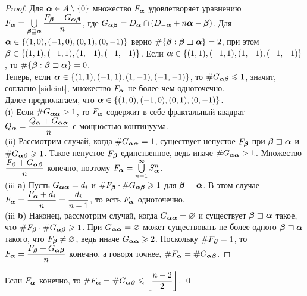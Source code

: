 \begin{proof}
Для ${\bm{\alpha}}\in A\setminus\{0\}$ множество $F_{\bm{\alpha}}$ удовлетворяет уравнению
$F_{\bm{\alpha}}=\bigcup\limits_{{\bm{\beta}}\sqsupseteq{\bm{\alpha}}} \dfrac{F_{\bm{\beta}}+G_{{\bm{\alpha}}{\bm{\beta}}}}{n}$, 
где $G_{{\bm{\alpha}}{\bm{\beta}}}=D_{\bm{\alpha}}\cap(D_{-{\bm{\alpha}}}+n{\bm{\alpha}}-{\bm{\beta}})$.
Для ${\bm{\alpha}}\in\{(1,0), (-1,0), (0,1), (0,-1)\}$ верно $\#\{{\bm{\beta}}:{\bm{\beta}}\sqsupset{\bm{\alpha}}\}=2$, при этом ${\bm{\beta}}\in\{(1,1), (-1,1), (1,-1), (-1,-1)\}$.
Если ${\bm{\alpha}}\in\{(1,1), (-1,1), (1,-1), (-1,-1)\}$, то $\#\{{\bm{\beta}}:{\bm{\beta}}\sqsupset{\bm{\alpha}}\}=0$.\\

Теперь, если ${\bm{\alpha}}\in\{(1,1), (-1,1), (1,-1), (-1,-1)\}$, то $\#G_{{\bm{\alpha}}{\bm{\beta}}}\leqslant1$, значит, согласно \ref{sideint}, множество $F_{\bm{\alpha}}$ не более чем одноточечно.\\

Далее предполагаем, что ${\bm{\alpha}}\in\{(1,0), (-1,0), (0,1), (0,-1)\}$.\\

(i) Если $\#G_{{\bm{\alpha}}{\bm{\alpha}}}> 1$, то $F_{\bm{\alpha}}$ содержит в себе фрактальный квадрат $Q_{\bm{\alpha}}=\dfrac{Q_{\bm{\alpha}}+G_{{\bm{\alpha}}{\bm{\alpha}}}}{n}$ с мощностью континуума.\\

(ii) Рассмотрим случай, когда $\#G_{{\bm{\alpha}}{\bm{\alpha}}}=1$, существует непустое $F_{\bm{\beta}}$ при ${\bm{\beta}}\sqsupset{\bm{\alpha}}$ и $\#G_{{\bm{\alpha}}{\bm{\beta}}}\geqslant1$. 
Такое непустое $F_{\bm{\beta}}$ единственное, ведь иначе $\#G_{{\bm{\alpha}}{\bm{\alpha}}}>1$.
Множество $\dfrac{F_{\bm{\beta}}+G_{{\bm{\alpha}}{\bm{\beta}}}}{n}$ конечно, поэтому $F_{\bm{\alpha}}=\bigcup\limits_{n=1}^\infty S_{\bm{\alpha}}^n$.\\

(iii {\bf a}) Пусть $G_{{\bm{\alpha}}{\bm{\alpha}}}=d_i$ и $\#F_{\bm{\beta}}\cdot\#G_{{\bm{\alpha}}{\bm{\beta}}}\geqslant1$ для ${\bm{\beta}}\sqsupset{\bm{\alpha}}$.
В этом случае $F_{\bm{\alpha}}=\dfrac{F_{\bm{\alpha}}+d_i}{n}=\dfrac{d_i}{n-1}$, то есть $F_{\bm{\alpha}}$ одноточечно.\\

(iii {\bf b}) Наконец, рассмотрим случай, когда $G_{{\bm{\alpha}}{\bm{\alpha}}}=\varnothing$ и существует ${\bm{\beta}}\sqsupset{\bm{\alpha}}$ такое, что $\#F_{\bm{\beta}}\cdot\#G_{{\bm{\alpha}}{\bm{\beta}}}\geqslant1$.
При $G_{{\bm{\alpha}}{\bm{\alpha}}}=\varnothing$ может существовать не более одного ${\bm{\beta}}\sqsupset{\bm{\alpha}}$ такого, что $F_{\bm{\beta}}\neq\varnothing$, ведь иначе $G_{{\bm{\alpha}}{\bm{\alpha}}}\geqslant2$.
Поскольку $\#F_{\bm{\beta}}=1$, то $F_{\bm{\alpha}}=\dfrac{F_{\bm{\beta}}+G_{{\bm{\alpha}}{\bm{\beta}}}}{n}$ конечно, а говоря точнее, $\#F_{\bm{\alpha}}=\#G_{{\bm{\alpha}}{\bm{\beta}}}$.
\end{proof}

\begin{corollary}\label{onepoint} 
Если $F_{\bm{\alpha}}$ конечно, то  $\#F_{\bm{\alpha}}=\#G_{{\bm{\alpha}}{\bm{\beta}}}\leqslant\left\lfloor\dfrac{n-2}{2}\right\rfloor$.
\hfill\qed
\end{corollary}

